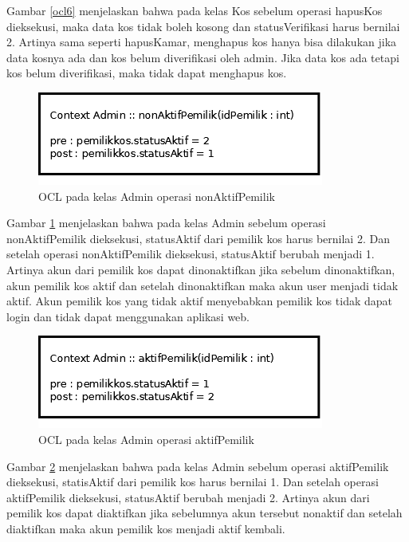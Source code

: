 	Gambar \ref{ocl6} menjelaskan bahwa pada kelas Kos sebelum operasi hapusKos dieksekusi, maka data kos tidak boleh kosong dan statusVerifikasi harus bernilai 2. Artinya sama seperti hapusKamar, menghapus kos hanya bisa dilakukan jika data kosnya ada dan kos belum diverifikasi oleh admin. Jika data kos ada tetapi kos belum diverifikasi, maka tidak dapat menghapus kos.
	
	\begin{figure}[H]
		\centering
		\includegraphics[scale=0.7]{gambar/ocl/nonAktifPemilik}
		\caption{OCL pada kelas Admin operasi nonAktifPemilik}
		\label{ocl7}
	\end{figure} 
	
	Gambar \ref{ocl7} menjelaskan bahwa pada kelas Admin sebelum operasi nonAktifPemilik dieksekusi, statusAktif dari pemilik kos harus bernilai 2. Dan setelah operasi nonAktifPemilik dieksekusi, statusAktif berubah menjadi 1. Artinya akun dari pemilik kos dapat dinonaktifkan jika sebelum dinonaktifkan, akun pemilik kos aktif dan setelah dinonaktifkan maka akun user menjadi tidak aktif. Akun pemilik kos yang tidak aktif menyebabkan pemilik kos tidak dapat login dan tidak dapat menggunakan aplikasi web.
	
	\begin{figure}[H]
		\centering
		\includegraphics[scale=0.7]{gambar/ocl/aktifPemilik}
		\caption{OCL pada kelas Admin operasi aktifPemilik}
		\label{ocl8}
	\end{figure} 
	
	Gambar \ref{ocl8} menjelaskan bahwa pada kelas Admin sebelum operasi aktifPemilik dieksekusi, statisAktif dari pemilik kos harus bernilai 1. Dan setelah operasi aktifPemilik dieksekusi, statusAktif berubah menjadi 2. Artinya akun dari pemilik kos dapat diaktifkan jika sebelumnya akun tersebut nonaktif dan setelah diaktifkan maka akun pemilik kos menjadi aktif kembali.
	
